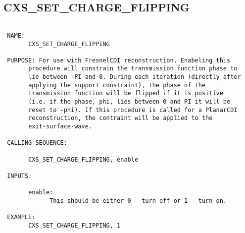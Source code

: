   
 
\subsection{CXS\_SET\_CHARGE\_FLIPPING}
\begin{verbatim}

 NAME:
       CXS_SET_CHARGE_FLIPPING

 PURPOSE: For use with FresnelCDI reconstruction. Enabeling this
       procedure will constrain the transmission function phase to
       lie between -PI and 0. During each iteration (directly after
       applying the support constraint), the phase of the
       transmission function will be flipped if it is positive
       (i.e. if the phase, phi, lies between 0 and PI it will be
       reset to -phi). If this procedure is called for a PlanarCDI
       reconstruction, the contraint will be applied to the
       exit-surface-wave.

 CALLING SEQUENCE:

       CXS_SET_CHARGE_FLIPPING, enable

 INPUTS:

       enable:
             This should be either 0 - turn off or 1 - turn on.

 EXAMPLE:
       CXS_SET_CHARGE_FLIPPING, 1

\end{verbatim}






  
 
